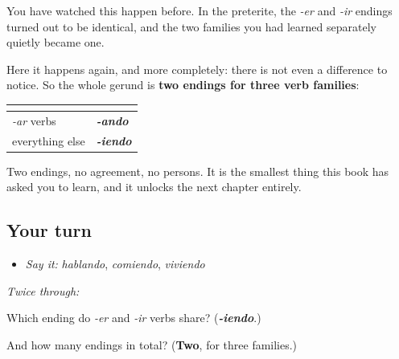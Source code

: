 \begin{culture}
You have watched this happen before. In the preterite, the \emph{-er} and \emph{-ir} endings turned out to be identical, and the two families you had learned separately quietly became one.

Here it happens again, and more completely: there is not even a difference to notice. So the whole gerund is \textbf{two endings for three verb families}:

\noindent
\begin{tabularx}{\linewidth}{@{}>{\raggedright\arraybackslash}X>{\raggedright\arraybackslash}X@{}}
\toprule
\textbf{} & \textbf{} \\
\midrule
\emph{-ar} verbs & \emph{\textbf{-ando}} \\
everything else & \emph{\textbf{-iendo}} \\
\bottomrule
\end{tabularx}

Two endings, no agreement, no persons. It is the smallest thing this book has asked you to learn, and it unlocks the next chapter entirely.
\end{culture}

\subsection*{Your turn}
\begin{itemize}
\raggedright
  \item \emph{Say it:} \emph{hablando}, \emph{comiendo}, \emph{viviendo}
\end{itemize}

\emph{Twice through:}

\begin{tcolorbox}[breakable,colback=teal!4,colframe=teal!35!black,title={Before you move on}]
Which ending do \emph{-er} and \emph{-ir} verbs share? (\emph{\textbf{-iendo}}.)

And how many endings in total? (\textbf{Two}, for three families.)
\end{tcolorbox}
